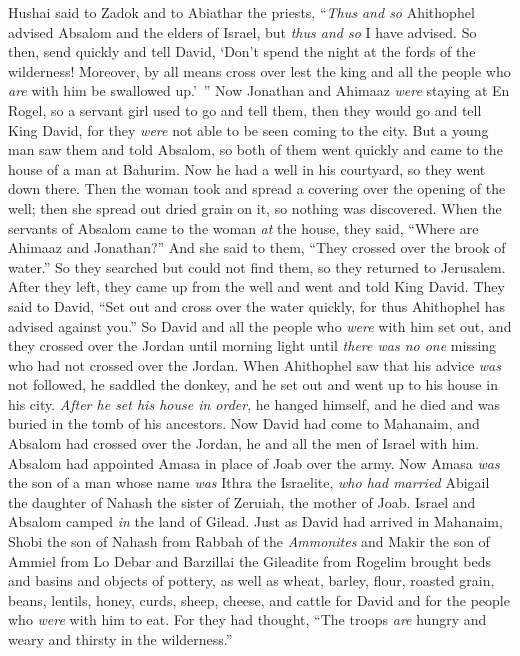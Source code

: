 \begin{biblechapter}
 Hushai said to Zadok and to Abiathar the priests, “\textit{Thus and so} Ahithophel advised Absalom and the elders of Israel, but \textit{thus and so} I have advised.
\verse So then, send quickly and tell David, ‘Don’t spend the night at the fords of the wilderness! Moreover, by all means cross over lest the king and all the people who \textit{are} with him be swallowed up.’ ”
\verse Now Jonathan and Ahimaaz \textit{were} staying at En Rogel, so a servant girl used to go and tell them, then they would go and tell King David, for they \textit{were} not able to be seen coming to the city.
\verse But a young man saw them and told Absalom, so both of them went quickly and came to the house of a man at Bahurim. Now he had a well in his courtyard, so they went down there.
\verse Then the woman took and spread a covering over the opening of the well; then she spread out dried grain on it, so nothing was discovered.
\verse When the servants of Absalom came to the woman \textit{at} the house, they said, “Where are Ahimaaz and Jonathan?” And she said to them, “They crossed over the brook of water.” So they searched but could not find them, so they returned to Jerusalem.
\verse After they left, they came up from the well and went and told King David. They said to David, “Set out and cross over the water quickly, for thus Ahithophel has advised against you.”
\verse So David and all the people who \textit{were} with him set out, and they crossed over the Jordan until morning light until \textit{there was no one} missing who had not crossed over the Jordan.
\verse When Ahithophel saw that his advice \textit{was} not followed, he saddled the donkey, and he set out and went up to his house in his city. \textit{After he set his house in order}, he hanged himself, and he died and was buried in the tomb of his ancestors.
\verse Now David had come to Mahanaim, and Absalom had crossed over the Jordan, he and all the men of Israel with him.
\verse Absalom had appointed Amasa in place of Joab over the army. Now Amasa \textit{was} the son of a man whose name \textit{was} Ithra the Israelite, \textit{who had married} Abigail the daughter of Nahash the sister of Zeruiah, the mother of Joab.
\verse Israel and Absalom camped \textit{in} the land of Gilead.
\verse Just as David had arrived in Mahanaim, Shobi the son of Nahash from Rabbah of the \textit{Ammonites} and Makir the son of Ammiel from Lo Debar and Barzillai the Gileadite from Rogelim
\verse brought beds and basins and objects of pottery, as well as wheat, barley, flour, roasted grain, beans, lentils,
\verse honey, curds, sheep, cheese, and cattle for David and for the people who \textit{were} with him to eat. For they had thought, “The troops \textit{are} hungry and weary and thirsty in the wilderness.”
\end{biblechapter}

